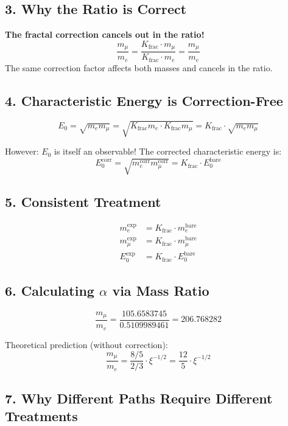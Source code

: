 	\subsection*{3. Why the Ratio is Correct}
	
	\begin{tcolorbox}[colback=green!5!white,colframe=green!75!black]
		\textbf{The fractal correction cancels out in the ratio!}
		\[
		\frac{m_\mu}{m_e} = \frac{K_{\text{frac}} \cdot m_\mu}{K_{\text{frac}} \cdot m_e} = \frac{m_\mu}{m_e}
		\]
		The same correction factor affects both masses and cancels in the ratio.
	\end{tcolorbox}
	
	\subsection*{4. Characteristic Energy is Correction-Free}
	
	\[
	E_0 = \sqrt{m_e m_\mu} = \sqrt{K_{\text{frac}} m_e \cdot K_{\text{frac}} m_\mu} = K_{\text{frac}} \cdot \sqrt{m_e m_\mu}
	\]
	
	However: $E_0$ is itself an observable! The corrected characteristic energy is:
	\[
	E_0^{\text{corr}} = \sqrt{m_e^{\text{corr}} m_\mu^{\text{corr}}} = K_{\text{frac}} \cdot E_0^{\text{bare}}
	\]
	
	\subsection*{5. Consistent Treatment}
	
	\begin{align*}
		m_e^{\text{exp}} &= K_{\text{frac}} \cdot m_e^{\text{bare}} \\
		m_\mu^{\text{exp}} &= K_{\text{frac}} \cdot m_\mu^{\text{bare}} \\
		E_0^{\text{exp}} &= K_{\text{frac}} \cdot E_0^{\text{bare}}
	\end{align*}
	
	\subsection*{6. Calculating $\alpha$ via Mass Ratio}
	
	\[
	\frac{m_\mu}{m_e} = \frac{105.6583745}{0.5109989461} = 206.768282
	\]
	
	Theoretical prediction (without correction):
	\[
	\frac{m_\mu}{m_e} = \frac{8/5}{2/3} \cdot \xi^{-1/2} = \frac{12}{5} \cdot \xi^{-1/2}
	\]
	
	\subsection*{7. Why Different Paths Require Different Treatments}
	
